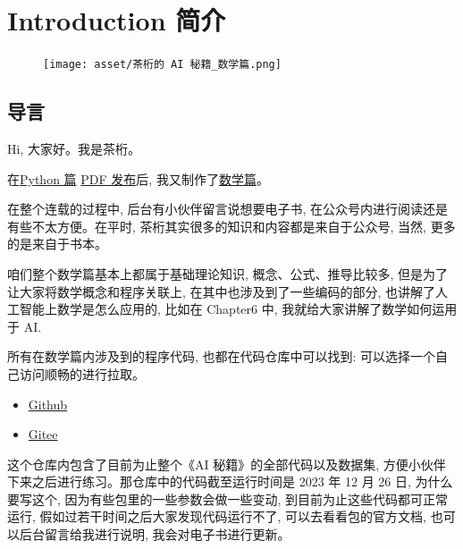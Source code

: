\chapter{Introduction 简介}
\begin{figure}[ht]
  \centering\texttt{[image: asset/茶桁的 AI 秘籍\_数学篇.png]}
\end{figure}

\newpage
\section{导言}

Hi, 大家好。我是茶桁。

在\href{https://mp.weixin.qq.com/mp/appmsgalbum?__biz=MzA4NzE4MDQzMg==&action=getalbum&album_id=3035995870421073928&scene=173&subscene=&sessionid=undefined&enterid=0&from_msgid=2648748542&from_itemidx=1&count=3&nolastread=1#wechat_redirect}{Python 篇} \href{https://mp.weixin.qq.com/s/mbnag65xDP-1Ct_81Byn5g}{PDF 发布}后, 我又制作了\href{https://mp.weixin.qq.com/mp/appmsgalbum?__biz=MzA4NzE4MDQzMg==&action=getalbum&album_id=3074770001140400130&from_itemidx=1&from_msgid=2648748768#wechat_redirect}{数学篇}。
  
在整个连载的过程中, 后台有小伙伴留言说想要电子书, 在公众号内进行阅读还是有些不太方便。在平时, 茶桁其实很多的知识和内容都是来自于公众号, 当然, 更多的是来自于书本。

咱们整个数学篇基本上都属于基础理论知识, 概念、公式、推导比较多, 但是为了让大家将数学概念和程序关联上, 在其中也涉及到了一些编码的部分, 也讲解了人工智能上数学是怎么应用的, 比如在 Chapter6 中, 我就给大家讲解了\hypertarget{数学如何运用于 AI}{数学如何运用于 AI}.

所有在数学篇内涉及到的程序代码, 也都在代码仓库中可以找到: 可以选择一个自己访问顺畅的进行拉取。

\begin{itemize}
  \item \href{https://github.com/hivandu/AI_Cheats}{Github}
  \item \href{https://gitee.com/hivandu/ai_cheats}{Gitee}
\end{itemize}

这个仓库内包含了目前为止整个《AI 秘籍》的全部代码以及数据集, 方便小伙伴下来之后进行练习。那仓库中的代码截至运行时间是 2023 年 12 月 26 日, 为什么要写这个, 因为有些包里的一些参数会做一些变动, 到目前为止这些代码都可正常运行, 假如过若干时间之后大家发现代码运行不了, 可以去看看包的官方文档, 也可以后台留言给我进行说明, 我会对电子书进行更新。

